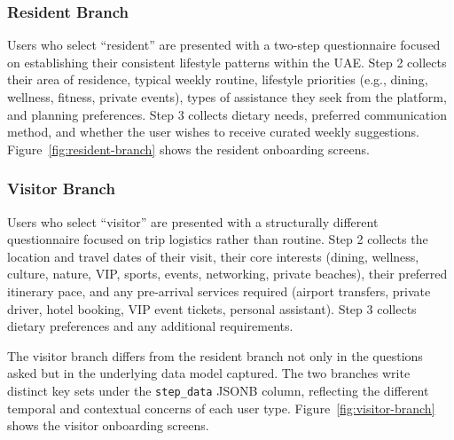 \newpage
\subsubsection{Resident Branch}
Users who select ``resident'' are presented with a two-step questionnaire focused on establishing their consistent lifestyle patterns within the UAE. Step 2 collects their area of residence, typical weekly routine, lifestyle priorities (e.g., dining, wellness, fitness, private events), types of assistance they seek from the platform, and planning preferences. Step 3 collects dietary needs, preferred communication method, and whether the user wishes to receive curated weekly suggestions. Figure~\ref{fig:resident-branch} shows the resident onboarding screens.


\subsubsection{Visitor Branch}
Users who select ``visitor'' are presented with a structurally different questionnaire focused on trip logistics rather than routine. Step 2 collects the location and travel dates of their visit, their core interests (dining, wellness, culture, nature, VIP, sports, events, networking, private beaches), their preferred itinerary pace, and any pre-arrival services required (airport transfers, private driver, hotel booking, VIP event tickets, personal assistant). Step 3 collects dietary preferences and any additional requirements.

The visitor branch differs from the resident branch not only in the questions asked but in the underlying data model captured. The two branches write distinct key sets under the \texttt{step\_data} JSONB column, reflecting the different temporal and contextual concerns of each user type. Figure~\ref{fig:visitor-branch} shows the visitor onboarding screens.


